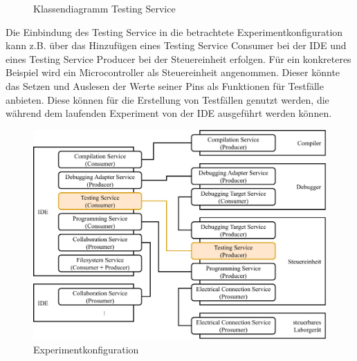 \begin{figure}[tbp]
    \centering
    \caption{Klassendiagramm Testing Service}
    \label{figure:klassendiagramm-testing-service}
\end{figure}

Die Einbindung des Testing Service in die betrachtete Experimentkonfiguration kann z.B. über das Hinzufügen eines Testing Service Consumer bei der IDE und eines Testing Service Producer bei der Steuereinheit erfolgen. Für ein konkreteres Beispiel wird ein Microcontroller als Steuereinheit angenommen. Dieser könnte das Setzen und Auslesen der Werte seiner Pins als Funktionen für Testfälle anbieten. Diese können für die Erstellung von Testfällen genutzt werden, die während dem laufenden Experiment von der IDE ausgeführt werden können.

\begin{figure}[htbp]
    \centering
    \includegraphics[width=\textwidth]{diagrams/experimentkonfigurationen/Experimentkonfiguration-05.drawio.pdf}
    \caption{Experimentkonfiguration}
    \label{figure:experimentkonfiguration:testen}
\end{figure}